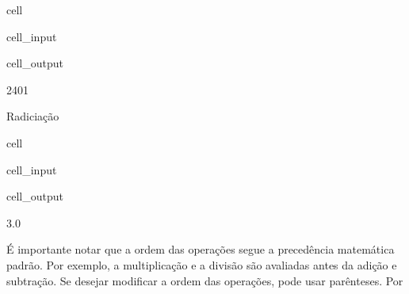 \documentclass[letterpaper,10pt,english]{jupyterBook}
\begin{document}
\begin{sphinxuseclass}{cell}\begin{sphinxVerbatimInput}

\begin{sphinxuseclass}{cell_input}
\begin{sphinxVerbatim}[commandchars=\\\{\}]
\end{sphinxVerbatim}

\end{sphinxuseclass}\end{sphinxVerbatimInput}
\begin{sphinxVerbatimOutput}

\begin{sphinxuseclass}{cell_output}
\begin{sphinxVerbatim}[commandchars=\\\{\}]
2401
\end{sphinxVerbatim}

\end{sphinxuseclass}\end{sphinxVerbatimOutput}

\end{sphinxuseclass}
\sphinxAtStartPar
Radiciação

\begin{sphinxuseclass}{cell}\begin{sphinxVerbatimInput}

\begin{sphinxuseclass}{cell_input}
\begin{sphinxVerbatim}[commandchars=\\\{\}]
\end{sphinxVerbatim}

\end{sphinxuseclass}\end{sphinxVerbatimInput}
\begin{sphinxVerbatimOutput}

\begin{sphinxuseclass}{cell_output}
\begin{sphinxVerbatim}[commandchars=\\\{\}]
3.0
\end{sphinxVerbatim}

\end{sphinxuseclass}\end{sphinxVerbatimOutput}

\end{sphinxuseclass}
\sphinxAtStartPar
É importante notar que a ordem das operações segue a precedência matemática padrão. Por exemplo, a multiplicação e a divisão são avaliadas antes da adição e subtração. Se desejar modificar a ordem das operações, pode usar parênteses. Por
\end{document}

